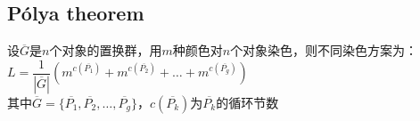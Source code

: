 \subsection*{Pólya theorem}
    设$ \overline{G} $是$ n $个对象的置换群，用$ m $种颜色对$ n $个对象染色，则不同染色方案为：
    \\$ L = \dfrac{1}{\left| \overline{G} \right|} (m^{c(\overline{P_1})} + m^{c(\overline{P_2})} + \dots + m^{c(\overline{P_g})}) $
    \\其中$ \overline{G} = \lbrace \overline{P_1}, \overline{P_2}, \dots, \overline{P_g} \rbrace $，$ c(\overline{P_k}) $为$ \overline{P_k} $的循环节数
